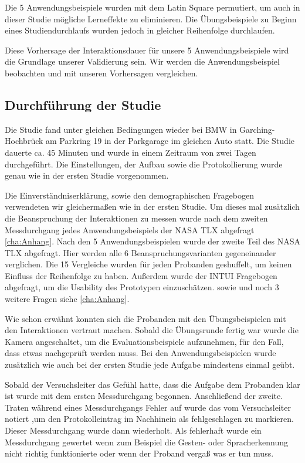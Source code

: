 Die 5 Anwendungsbeispiele wurden mit dem Latin Square permutiert, um auch in dieser Studie mögliche Lerneffekte zu eliminieren. Die Übungsbeispiele zu Beginn eines Studiendurchlaufs wurden jedoch in gleicher Reihenfolge durchlaufen. 

Diese Vorhersage der Interaktionsdauer für unsere 5 Anwendungsbeispiele wird die Grundlage unserer Validierung sein. Wir werden die Anwendungsbeispiel beobachten und mit unseren Vorhersagen vergleichen. 

\subsection[Durchführung der Studie]{Durchführung der Studie}
Die Studie fand unter gleichen Bedingungen wieder bei BMW in Garching-Hochbrück am Parkring 19 in der Parkgarage im gleichen Auto statt. Die Studie dauerte ca. 45 Minuten und wurde in einem Zeitraum von zwei Tagen durchgeführt. Die Einstellungen, der Aufbau sowie die Protokollierung wurde genau wie in der ersten Studie vorgenommen. 

Die Einverständniserklärung, sowie den demographischen Fragebogen verwendeten wir gleichermaßen wie in der ersten Studie. Um dieses mal zusätzlich die Beanspruchung der Interaktionen zu messen wurde nach dem zweiten Messdurchgang jedes Anwendungsbeispiels der NASA TLX abgefragt \ref{cha:Anhang}. Nach den 5 Anwendungsbeispielen wurde der zweite Teil des NASA TLX abgefragt. Hier werden alle 6 Beanspruchungsvarianten gegeneinander verglichen. Die 15 Vergleiche wurden für jeden Probanden geshuffelt, um keinen Einfluss der Reihenfolge zu haben. Außerdem wurde der INTUI Fragebogen abgefragt, um die Usability des Prototypen einzuschätzen. sowie und noch 3 weitere Fragen siehe \ref{cha:Anhang}. 

Wie schon erwähnt konnten sich die Probanden mit den Übungsbeispielen mit den Interaktionen vertraut machen. Sobald die Übungsrunde fertig war wurde die Kamera angeschaltet, um die Evaluationsbeispiele aufzunehmen, für den Fall, dass etwas nachgeprüft werden muss. Bei den Anwendungsbeispielen wurde zusätzlich wie auch bei der ersten Studie jede Aufgabe mindestens einmal geübt. 

Sobald der Versuchsleiter das Gefühl hatte, dass die Aufgabe dem Probanden klar ist wurde mit dem ersten Messdurchgang begonnen. Anschließend der zweite. Traten während eines Messdurchgangs Fehler auf wurde das vom Versuchsleiter notiert ,um den Protokolleintrag im Nachhinein als fehlgeschlagen zu markieren. Dieser Messdurchgang wurde dann wiederholt. Als fehlerhaft wurde ein Messdurchgang gewertet wenn zum Beispiel die Gesten- oder Spracherkennung nicht richtig funktionierte oder wenn der Proband vergaß was er tun muss. 

